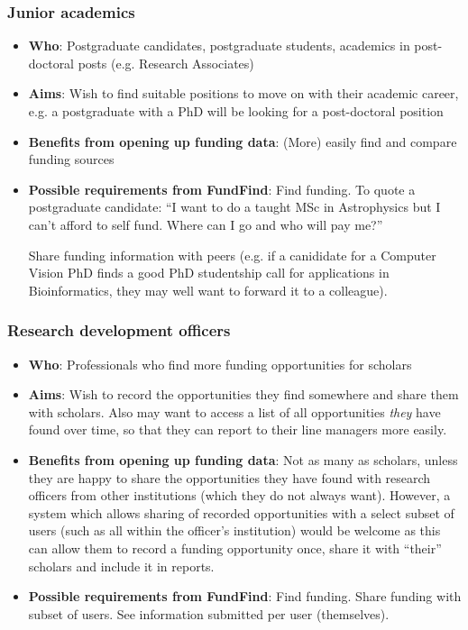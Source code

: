 \subsubsection{Junior academics}
\begin{itemize}
 \item \textbf{Who}: Postgraduate candidates, postgraduate students, academics in post-doctoral posts (e.g. Research Associates)
 \item \textbf{Aims}: Wish to find suitable positions to move on with their academic career, e.g. a postgraduate with a PhD will be looking for a post-doctoral position
 \item \textbf{Benefits from opening up funding data}: (More) easily find and compare funding sources
 \item \textbf{Possible requirements from FundFind}: Find funding. To quote a postgraduate candidate: ``I want to do a taught MSc in Astrophysics but I can't afford to self fund. Where can I go and who will pay me?''
 
 Share funding information with peers (e.g. if a canididate for a Computer Vision PhD finds a good PhD studentship call for applications in Bioinformatics, they may well want to forward it to a colleague).
\end{itemize}

\subsubsection{Research development officers}
\begin{itemize}
 \item \textbf{Who}: Professionals who find more funding opportunities for scholars
 \item \textbf{Aims}: Wish to record the opportunities they find somewhere and share them with scholars. Also may want to access a list of all opportunities \emph{they} have found over time, so that they can report to their line managers more easily.
 \item \textbf{Benefits from opening up funding data}: Not as many as scholars, unless they are happy to share the opportunities they have found with research officers from other institutions (which they do not always want). However, a system which allows sharing of recorded opportunities with a select subset of users (such as all within the officer's institution) would be welcome as this can allow them to record a funding opportunity once, share it with ``their'' scholars and include it in reports.
 \item \textbf{Possible requirements from FundFind}: Find funding. Share funding with subset of users. See information submitted per user (themselves).
\end{itemize}

